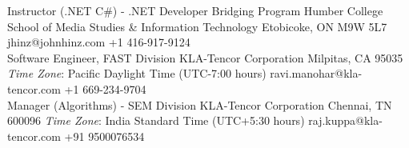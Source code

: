 
    {Instructor (.NET C\#) - .NET Developer Bridging Program}
    {Humber College School of Media Studies \& Information Technology}
    {Etobicoke, ON M9W 5L7}
    {}
    {jhinz@johnhinz.com}
    {+1 416-917-9124}\\[1em]
    {Software Engineer, FAST Division}
    {KLA-Tencor Corporation}
    {Milpitas, CA 95035}
    {\emph{Time Zone}: Pacific Daylight Time (UTC-7:00 hours) }
    {ravi.manohar@kla-tencor.com}
    {+1 669-234-9704}\\[1em]
    {Manager (Algorithms) - SEM Division}
    {KLA-Tencor Corporation}
    {Chennai, TN 600096}
    {\emph{Time Zone}: India Standard Time (UTC+5:30 hours) }
    {raj.kuppa@kla-tencor.com}
    {+91 9500076534}\\[1em]
   	